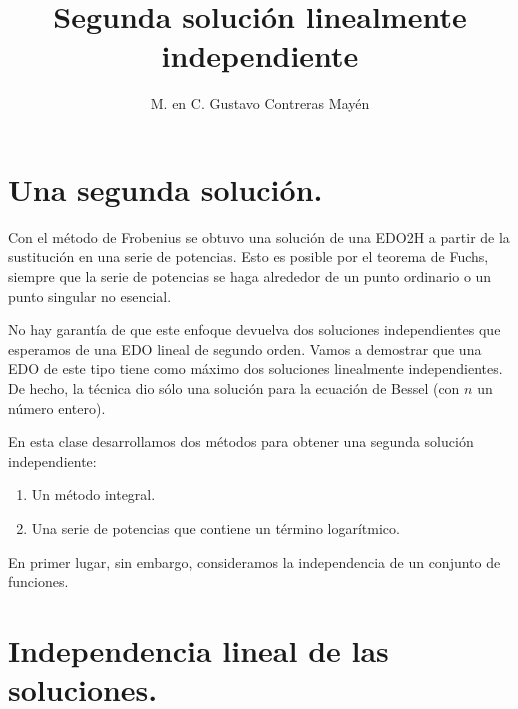 
\title{Segunda solución linealmente independiente}
\author{M. en C. Gustavo Contreras Mayén}
\date{ }
\newcommand{\Cancel}[2][black]{{\color{#1}\cancel{\color{black}#2}}}

\vspace{-4cm}
\maketitle
\fontsize{14}{14}\selectfont
\tableofcontents
\newpage

\section{Una segunda solución.}

Con el método de Frobenius se obtuvo una solución de una EDO2H a partir de la sustitución en una serie de potencias. Esto es posible por el teorema de Fuchs, siempre que la serie de potencias se haga alrededor de un punto ordinario o un punto singular no esencial.
\par
No hay garantía de que este enfoque devuelva dos soluciones independientes que esperamos de una EDO lineal de segundo orden. Vamos a demostrar que una EDO de este tipo tiene como máximo dos soluciones linealmente independientes. De hecho, la técnica dio sólo una solución para la ecuación de Bessel (con $n$ un número entero).
\par
En esta clase desarrollamos dos métodos para obtener una segunda solución independiente:
\begin{enumerate}
\item Un método integral.
\item Una serie de potencias que contiene un término logarítmico.
\end{enumerate}
En primer lugar, sin embargo, consideramos la independencia de un conjunto de funciones.

\section{Independencia lineal de las soluciones.}

